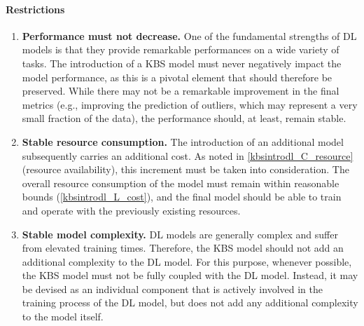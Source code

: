 \paragraph{Restrictions}
\begin{enumerate} [start=1,label={\bfseries R\arabic*.}]
    \item \label{kbsintrodl_R_performance} \textbf{Performance must not decrease.} One of the fundamental strengths of DL models is that they provide remarkable performances on a wide variety of tasks. The introduction of a KBS model must never negatively impact the model performance, as this is a pivotal element that should therefore be preserved. While there may not be a remarkable improvement in the final metrics (e.g., improving the prediction of outliers, which may represent a very small fraction of the data), the performance should, at least, remain stable.
    
    \item \label{kbsintrodl_R_resource} \textbf{Stable resource consumption.} The introduction of an additional model subsequently carries an additional cost. As noted in \ref{kbsintrodl_C_resource} (resource availability), this increment must be taken into consideration. The overall resource consumption of the model must remain within reasonable bounds (\ref{kbsintrodl_L_cost}), and the final model should be able to train and operate with the previously existing resources.
    
    \item \label{kbsintrodl_R_complexity} \textbf{Stable model complexity.} DL models are generally complex and suffer from elevated training times. Therefore, the KBS model should not add an additional complexity to the DL model. For this purpose, whenever possible, the KBS model must not be fully coupled with the DL model. Instead, it may be devised as an individual component that is actively involved in the training process of the DL model, but does not add any additional complexity to the model itself. 
    
\end{enumerate}
